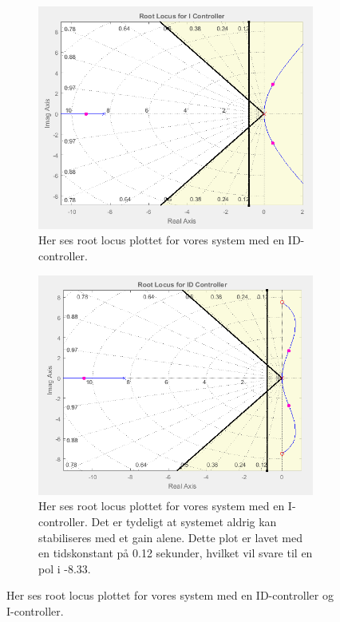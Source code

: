 \begin{figure}[t!]
    \centering
    \begin{subfigure}[t]{0.49\textwidth}
     \centering
        \includegraphics[width=1\textwidth]{Billeder/I_rlocus.PNG}
        \caption{Her ses root locus plottet for vores system med en ID-controller.}
        \label{fig:ID_rlocus}
    \end{subfigure}
    \begin{subfigure}[t]{0.49\textwidth}
     \centering
        \includegraphics[width=1\textwidth]{Billeder/ID_rlocus.PNG}
        \caption{Her ses root locus plottet for vores system med en I-controller. Det er tydeligt at systemet aldrig kan stabiliseres med et gain alene. Dette plot er lavet med en tidskonstant på 0.12 sekunder, hvilket vil svare til en pol i -8.33.}
        \label{fig:I_rlocus}
    \end{subfigure}
    \caption{Her ses root locus plottet for vores system med en ID-controller og I-controller.}
\end{figure}

